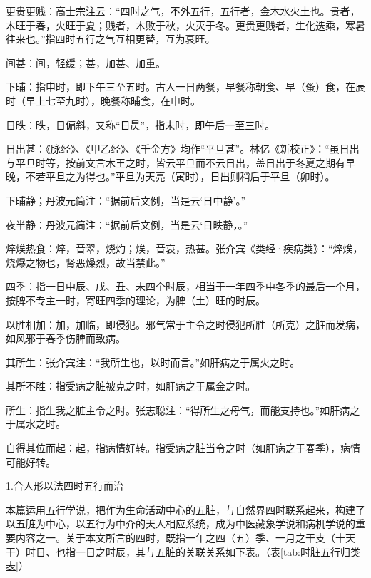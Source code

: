 \documentclass[12pt]{ctexbook}
\begin{document}
\begin{jiaozhu}
	\item 更贵更贱：高士宗注云：“四时之气，不外五行，五行者，金木水火土也。贵者，木旺于春，火旺于夏；贱者，木败于秋，火灭于冬。更贵更贱者，生化迭乘，寒暑往来也。”指四时五行之气互相更替，互为衰旺。
	\item 间甚：间，轻缓；甚，加甚、加重。
	\item 下晡：指申时，即下午三至五时。古人一日两餐，早餐称朝食、早（蚤）食，在辰时（早上七至九时），晚餐称晡食，在申时。
	\item 日昳：昳，日偏斜，又称“日昃”，指未时，即午后一至三时。
	\item 日出甚：《脉经》、《甲乙经》、《千金方》均作“平旦甚”。林亿《新校正》：“虽日出与平旦时等，按前文言木王之时，皆云平旦而不云日出，盖日出于冬夏之期有早晚，不若平旦之为得也。”平旦为天亮（寅时），日出则稍后于平旦（卯时）。
	\item 下晡静；丹波元简注：“据前后文例，当是云‘日中静’。”
	\item 夜半静：丹波元简注：“据前后文例，当是云‘日昳静，。”
	\item 焠㶼热食：焠，音翠，烧灼；㶼，音哀，热甚。张介宾《类经·疾病类》：“焠㶼，烧爆之物也，肾恶燥烈，故当禁此。”
	\item 四季：指一日中辰、戌、丑、未四个时辰，相当于一年四季中各季的最后一个月，按脾不专主一时，寄旺四季的理论，为脾（土）旺的时辰。
	\item 以胜相加：加，加临，即侵犯。邪气常于主令之时侵犯所胜（所克）之脏而发病，如风邪于春季伤脾而致病。
	\item 其所生：张介宾注：“我所生也，以时而言。”如肝病之于属火之时。
	\item 其所不胜：指受病之脏被克之时，如肝病之于属金之时。
	\item 所生：指生我之脏主令之时。张志聪注：“得所生之母气，而能支持也。”如肝病之于属水之时。
	\item 自得其位而起：起，指病情好转。指受病之脏当令之时（如肝病之于春季），病情可能好转。
\end{jiaozhu}


1.合人形以法四时五行而治

本篇运用五行学说，把作为生命活动中心的五脏，与自然界四时联系起来，构建了以五脏为中心，以五行为中介的天人相应系统，成为中医藏象学说和病机学说的重要内容之一。关于本文所言的四时，既指一年之四（五）季、一月之干支（十天干）时日、也指一日之时辰，其与五脏的关联关系如下表。（表\ref{tab:时脏五行归类表}）
\end{document}

